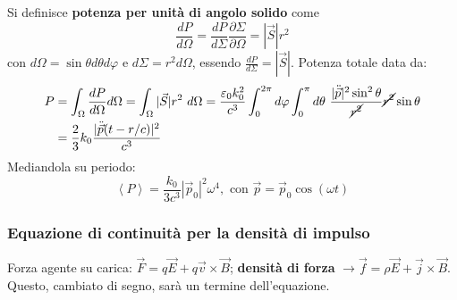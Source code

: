 \documentclass[a4paper]{scrartcl}
\numberwithin{equation}{subsection}
\theoremstyle{style1}
\begin{document}
Si definisce \textbf{potenza per unit\`a di angolo solido} come
\begin{equation}
	\frac{d P}{d \Omega } = \frac{d P}{d \Sigma} \frac{\partial \Sigma}{\partial \Omega } = |\vec{S} |r^2
\end{equation}
con $d\Omega = \sin \theta  d\theta  d\varphi $ e $d\Sigma = r^2 d\Omega $, essendo $\frac{d P}{d \Sigma} = |\vec{S}| $. Potenza totale data da:
\begin{equation}
	\begin{split}
		P &= \int_{\Omega } \frac{d P}{d \Omega } d\Omega = \int_{\Omega } |\vec{S}| r^2 \ d\Omega = \frac{\varepsilon _0 k_0^2}{c^3} \int_{0} ^{2\pi} d\varphi \int_{0} ^\pi d\theta \ \frac{|\ddot{\vec{p}}|^2 \sin ^2 \theta }{\cancel{r^2}} \cancel{r^2} \sin \theta  \\
		  &= \frac{2}{3} k_0 \frac{|\ddot{\vec{p}}(t- r / c)|^2}{c^3}
	\end{split}
\end{equation}
 Mediandola su periodo:
 \begin{equation}
 	\left\langle P \right\rangle= \frac{k_0}{3c^3} \left\lvert \vec{p}_0 \right\rvert ^2 \omega^4, \text{ con } \vec{p}=\vec{p}_0 \cos(\omega t)
 \end{equation}
\subsubsection{Equazione di continuit\`a per la densit\`a di impulso}

Forza agente su carica: $\vec{F}=q\vec{E}+q\vec{v}\times \vec{B}$; \textbf{densit\`a di forza} $\to \vec{f}=\rho \vec{E}+\vec{j}\times \vec{B}$. Questo, cambiato di segno, sar\`a un termine dell'equazione.
\end{document}
